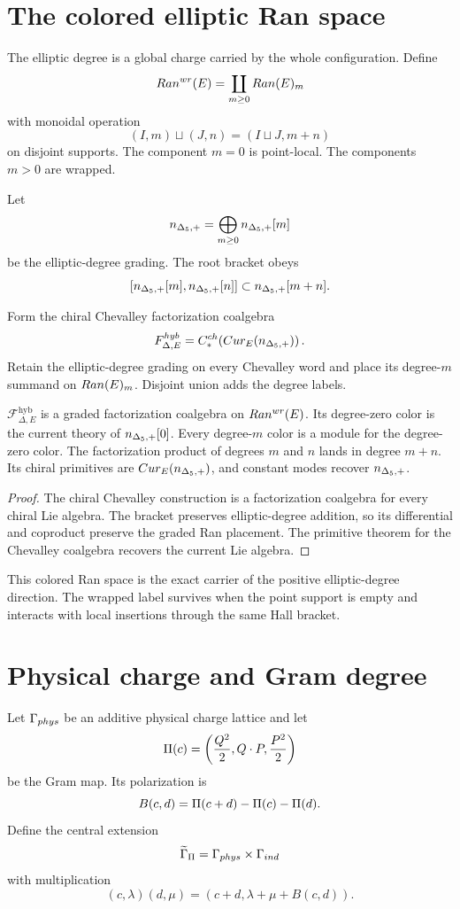 \chapter{The colored elliptic Ran space}
The elliptic degree is a global charge carried by the whole configuration.  Define
\[
 Ran^{wr}(E)=\coprod_{m\ge0}Ran(E)_m
\]
with monoidal operation
\[
 (I,m)\sqcup(J,n)=(I\sqcup J,m+n)
\]
on disjoint supports.  The component $m=0$ is point-local.  The components $m>0$ are wrapped.

Let
\[
 {n_{\Delta_5,+}}=\bigoplus_{m\ge0}{n_{\Delta_5,+}}[m]
\]
be the elliptic-degree grading.  The root bracket obeys
\[
 [{n_{\Delta_5,+}}[m],{n_{\Delta_5,+}}[n]]\subset{n_{\Delta_5,+}}[m+n].
\]

\begin{construction}
Form the chiral Chevalley factorization coalgebra
\[
 F^{hyb}_{\Delta,E}
 =C_*^{ch}\!\left(Cur_E({n_{\Delta_5,+}})\right).
\]
Retain the elliptic-degree grading on every Chevalley word and place its degree-$m$ summand on $Ran(E)_m$.  Disjoint union adds the degree labels.
\end{construction}

\begin{theorem}
$\mathcal F^{\mathrm{hyb}}_{\Delta,E}$ is a graded factorization coalgebra on $Ran^{wr}(E)$.  Its degree-zero color is the current theory of ${n_{\Delta_5,+}}[0]$.  Every degree-$m$ color is a module for the degree-zero color.  The factorization product of degrees $m$ and $n$ lands in degree $m+n$.  Its chiral primitives are $Cur_E({n_{\Delta_5,+}})$, and constant modes recover ${n_{\Delta_5,+}}$.
\end{theorem}
\begin{proof}
The chiral Chevalley construction is a factorization coalgebra for every chiral Lie algebra.  The bracket preserves elliptic-degree addition, so its differential and coproduct preserve the graded Ran placement.  The primitive theorem for the Chevalley coalgebra recovers the current Lie algebra.
\end{proof}

This colored Ran space is the exact carrier of the positive elliptic-degree direction.  The wrapped label survives when the point support is empty and interacts with local insertions through the same Hall bracket.

\chapter{Physical charge and Gram degree}
Let $\Gamma_{phys}$ be an additive physical charge lattice and let
\[
 \Pi(c)=\left(\frac{Q^2}{2},Q\cdot P,\frac{P^2}{2}\right)
\]
be the Gram map.  Its polarization is
\[
 B(c,d)=\Pi(c+d)-\Pi(c)-\Pi(d).
\]
Define the central extension
\[
 \widetilde\Gamma_\Pi=\Gamma_{phys}\times\Gamma_{ind}
\]
with multiplication
\[
 (c,\lambda)(d,\mu)
 =(c+d,\lambda+\mu+B(c,d)).
\]

